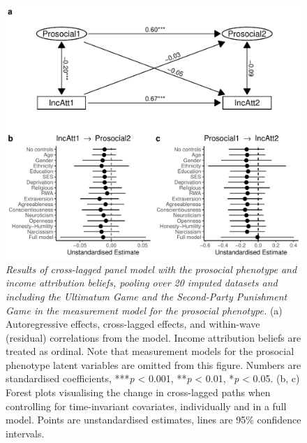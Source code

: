 \documentclass[
  man,floatsintext]{apa6}
\begin{document}
\begin{figure}
\centering
\includegraphics{manuscript_files/figure-latex/clpmPlotIncAttdMFull-1.pdf}
\caption{\label{fig:clpmPlotIncAttdMFull}\emph{Results of cross-lagged panel model with the
prosocial phenotype and income attribution beliefs, pooling over 20 imputed
datasets and including the Ultimatum Game and the Second-Party Punishment Game
in the measurement model for the prosocial phenotype.} (a) Autoregressive
effects, cross-lagged effects, and within-wave (residual) correlations from the
model. Income attribution beliefs are treated as ordinal. Note that measurement
models for the prosocial phenotype latent variables are omitted from this
figure. Numbers are standardised coefficients, ***\emph{p} \textless{} 0.001, **\emph{p} \textless{}
0.01, *\emph{p} \textless{} 0.05. (b, c) Forest plots visualising the change in cross-lagged
paths when controlling for time-invariant covariates, individually and in a full
model. Points are unstandardised estimates, lines are 95\% confidence intervals.}
\end{figure}

\newpage
\end{document}
